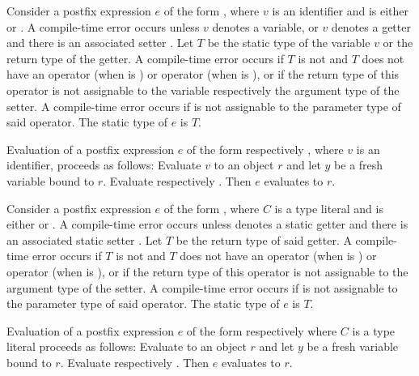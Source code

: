 \documentclass[makeidx]{article}
\begin{document}
{\LMHash{}%
Consider a postfix expression $e$ of the form ,
where $v$ is an identifier and \op{} is either \lit{++} or \lit{-{}-}.
A compile-time error occurs unless $v$ denotes a variable,
or $v$ denotes a getter and there is an associated setter .
Let $T$ be the static type of the variable $v$ or the return type of the getter.
A compile-time error occurs if $T$ is not \DYNAMIC{}
and $T$ does not have an operator \lit{+} (when \op{} is \lit{++})
or operator \lit{-} (when \op{} is \lit{-{}-}),
or if the return type of this operator is not assignable to
the variable respectively the argument type of the setter.
A compile-time error occurs if  is not assignable to
the parameter type of said operator.
The static type of $e$ is $T$.

\LMHash{}%
Evaluation of a postfix expression $e$
of the form  respectively ,
where $v$ is an identifier, proceeds as follows:
Evaluate $v$ to an object $r$ and let $y$ be a fresh variable bound to $r$.
Evaluate  respectively .
Then $e$ evaluates to $r$.

\EndCase

\LMHash{}%
Consider a postfix expression $e$ of the form ,
where $C$ is a type literal and \op{} is either \lit{++} or \lit{-{}-}.
A compile-time error occurs unless  denotes a static getter
and there is an associated static setter 
.
Let $T$ be the return type of said getter.
A compile-time error occurs if $T$ is not \DYNAMIC{}
and $T$ does not have an operator \lit{+} (when \op{} is \lit{++})
or operator \lit{-} (when \op{} is \lit{-{}-}),
or if the return type of this operator is not assignable to
the argument type of the setter.
A compile-time error occurs if  is not assignable to
the parameter type of said operator.
The static type of $e$ is $T$.

\LMHash{}%
Evaluation of a postfix expression $e$
of the form  respectively 
where $C$ is a type literal proceeds as follows:
Evaluate  to an object $r$
and let $y$ be a fresh variable bound to $r$.
Evaluate  respectively .
Then $e$ evaluates to $r$.
\EndCase

}
\end{document}

